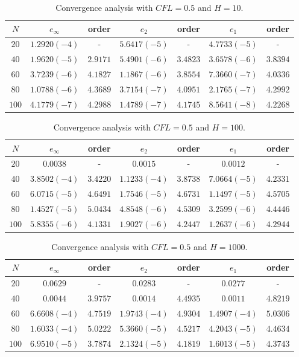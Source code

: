 \documentclass[10pt,a4paper]{amsart}
\begin{document}
\begin{table}[H!]
\begin{tabular}{c|c|c|c|c|c|c}
$N$ & $e_{\infty}$ & order & $e_2$ & order & $e_1$ & order \\ 
\hline 
\hline
$20$ & $1.2920 (-4)$ & - & $5.6417 (-5)$ & - & $4.7733 (-5)$ & - \\ 
\hline 
$40$ & $1.9620 (-5)$ & $2.9171$ & $5.4901 (-6)$ & $3.4823$ & $3.6578 (-6)$ & $3.8394$ \\ 
\hline 
$60$ & $3.7239 (-6)$ & $4.1827$ & $1.1867 (-6)$ & $3.8554$ & $7.3660 (-7)$ & $4.0336$ \\
\hline 
$80$ & $1.0788 (-6)$ & $4.3689$ & $3.7154 (-7)$ & $4.0951$ & $2.1765 (-7)$ & $4.2992$ \\ 
\hline 
$100$ & $4.1779(-7)$ & $4.2988$ & $1.4789 (-7)$ & $4.1745$ & $8.5641 (-8)$ & $4.2268$  \\ 
\end{tabular} 
\caption{Convergence analysis with $CFL=0.5$ and $H=10$.}
\label{CV_order4_hp10}
\end{table}

\begin{table}[H!]
\begin{tabular}{c|c|c|c|c|c|c}
$N$ & $e_{\infty}$ & order & $e_2$ & order & $e_1$ & order \\ 
\hline 
\hline
$20$ & $0.0038$ & - & $0.0015$ & - & $0.0012$ & - \\ 
\hline 
$40$ & $3.8502 (-4)$ & $3.4220$ & $1.1233 (-4)$ & $3.8738$ & $7.0664 (-5)$ & $4.2331$ \\ 
\hline 
$60$ & $6.0715 (-5)$ & $4.6491$ & $1.7546 (-5)$ & $4.6731$ & $1.1497 (-5)$ & $4.5705$ \\
\hline 
$80$ & $1.4527 (-5)$ & $5.0434$ & $4.8548 (-6)$ & $4.5309$ & $3.2599 (-6)$ & $4.4446$ \\ 
\hline 
$100$ & $5.8355(-6)$ & $4.1331$ & $1.9027 (-6)$ & $4.2447$ & $1.2637 (-6)$ & $4.2944$  \\ 
\end{tabular} 
\caption{Convergence analysis with $CFL=0.5$ and $H=100$.}
\label{CV_order4_hp100}
\end{table}

\begin{table}[H!]
\begin{tabular}{c|c|c|c|c|c|c}
$N$ & $e_{\infty}$ & order & $e_2$ & order & $e_1$ & order \\ 
\hline 
\hline
$20$ & $0.0629$ & - & $0.0283$ & - & $0.0277$ & - \\ 
\hline 
$40$ & $0.0044$ & $3.9757$ & $0.0014$ & $4.4935$ & $0.0011$ & $4.8219$ \\ 
\hline 
$60$ & $6.6608 (-4)$ & $4.7519$ & $1.9743 (-4)$ & $4.9304$ & $1.4907 (-4)$ & $5.0306$ \\
\hline 
$80$ & $1.6033 (-4)$ & $5.0222$ & $5.3660 (-5)$ & $4.5217$ & $4.2043 (-5)$ & $4.4634$ \\ 
\hline 
$100$ & $6.9510(-5)$ & $3.7874$ & $2.1324 (-5)$ & $4.1819$ & $1.6013 (-5)$ & $4.3743$  \\ 
\end{tabular} 
\caption{Convergence analysis with $CFL=0.5$ and $H=1000$.}
\label{CV_order4_hp1000}
\end{table}
\end{document}
